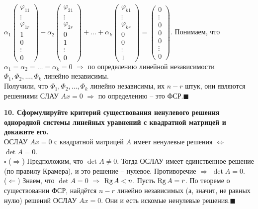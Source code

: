 \documentclass[11pt,a4paper]{article}
\newcommand{\Rg}[1]{\mathrm{Rg}\hspace{0.5mm}#1}
\newcommand{\proof}{$\square$ }
\newcommand{\qed}{\hfill$\blacksquare$}
\begin{document}
$\alpha_1 \left( \begin{matrix}
\varphi_{11} \\
\vdots \\
\varphi_{1r} \\
1 \\
0 \\
\vdots \\
0
\end{matrix}\right)
+ \alpha_2 \left( \begin{matrix}
\varphi_{21} \\
\vdots \\
\varphi_{2r} \\
0 \\
1 \\
\vdots \\
0
\end{matrix}\right)
+ \hdots + \alpha_k \left( \begin{matrix}
\varphi_{k1} \\
\vdots \\
\varphi_{kr} \\
0 \\
0 \\
\vdots \\
1
\end{matrix} \right) =
\left( \begin{matrix}
0 \\
\vdots \\
0 \\
0 \\
0 \\
\vdots \\
0
\end{matrix} \right)$.
Понимаем, что $\alpha_1 = \alpha_2 = \hdots = \alpha_k = 0$ $\Rightarrow$ по определению линейной независимости $\Phi_1, \Phi_2, \hdots, \Phi_k$ линейно независимы.\\
Получили, что $\Phi_1, \Phi_2, \hdots, \Phi_k$ линейно независимы, их $n - r$ штук, они являются решениями СЛАУ $Ax = 0$ $\Rightarrow$ по определению -- это ФСР.\qed

\textbf{10. Сформулируйте критерий существования ненулевого решения однородной системы линейных уравнений с квадратной матрицей и докажите его.\\}
ОСЛАУ $Ax = 0$ с квадратной матрицей $A$ имеет ненулевые решения $\Leftrightarrow$ $\det A = 0$.\\
\proof ($\Rightarrow$) Предположим, что $\det A \neq 0$. Тогда ОСЛАУ имеет единственное решение (по правилу Крамера), и это решение -- нулевое. Противоречие $\Rightarrow$ $\det A = 0$.\\
($\Leftarrow$) Знаем, что $\det A = 0$ $\Rightarrow$ $\Rg{A} < n$. Пусть $\Rg{A} = r$. По теореме о существовании ФСР, найдётся $n - r$ линейно независимых (а, значит, не равных нулю) решений ОСЛАУ $Ax = 0$. Они и есть искомые ненулевые решения.\qed
\end{document}
